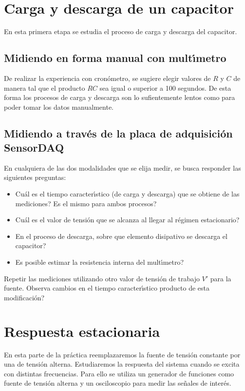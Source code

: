 \documentclass[laboratorio]{guia}
\begin{document}
\section{Carga y descarga de un capacitor}

En esta primera etapa se estudia el proceso de carga y descarga del capacitor. 

\subsection{Midiendo en forma manual con mult\'\i metro}

De realizar la experiencia con cron\'ometro, se sugiere elegir valores de $R$ y
$C$ de manera tal que el producto $RC$ sea igual o superior a 100 segundos. De
esta forma los procesos de carga y descarga son lo sufientemente lentos como
para poder tomar los datos manualmente. 

\subsection{Midiendo a trav\'es de la placa de adquisici\'on SensorDAQ}

En cualquiera de las dos modalidades que se elija medir, se busca responder
las siguientes preguntas:
\begin{itemize}
    \item Cu\'al es el tiempo caracter\'\i stico (de carga y descarga) que se 
        obtiene de las  mediciones? Es el mismo para ambos procesos?
    \item Cu\'al es el valor de tensi\'on que se alcanza al llegar al 
        r\'egimen estacionario? 
    \item En el proceso de descarga, sobre que elemento disipativo se 
        descarga el capacitor?
    \item Es posible estimar la resistencia interna del mult\'\i metro? 
\end{itemize}

Repetir las mediciones utilizando otro valor de tensi\'on de trabajo $V'$
para la fuente. Observa cambios en el tiempo caracter\'\i stico producto de
esta modificaci\'on?

\section{Respuesta estacionaria}

En esta parte de la pr\'actica reemplazaremos la fuente de tensi\'on 
constante por una de tensi\'on alterna. Estudiaremos la respuesta del sistema
cuando se excita con distintas frecuencias. Para ello se utiliza un generador
de funciones como fuente de tensi\'on alterna y un osciloscopio para medir
las se\~nales de inter\'es. 
\end{document}
